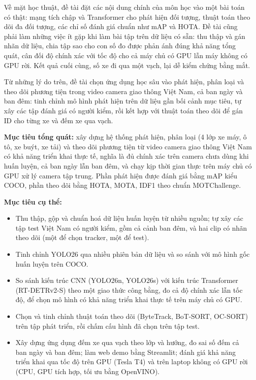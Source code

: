 Về mặt học thuật, đề tài đặt các nội dung chính của môn học vào một bài toán có thật: mạng tích chập và Transformer cho
phát hiện đối tượng, thuật toán theo dõi đa đối tượng, các chỉ số đánh giá chuẩn như mAP và HOTA. Đề tài cũng phải làm
những việc ít gặp khi làm bài tập trên dữ liệu có sẵn: thu thập và gán nhãn dữ liệu, chia tập sao cho con số đo được
phản ánh đúng khả năng tổng quát, cân đối độ chính xác với tốc độ cho cả máy chủ có GPU lẫn máy không có GPU rời. Kết
quả cuối cùng, số xe đi qua một vạch, lại dễ kiểm chứng bằng mắt.

Từ những lý do trên, đề tài chọn ứng dụng học sâu vào phát hiện, phân loại và theo dõi phương tiện trong video camera
giao thông Việt Nam, cả ban ngày và ban đêm: tinh chỉnh mô hình phát hiện trên dữ liệu gần bối cảnh mục tiêu, tự xây
các tập đánh giá có người kiểm, rồi kết hợp với thuật toán theo dõi để gán ID cho từng xe và đếm xe qua vạch.


\textbf{Mục tiêu tổng quát:} xây dựng hệ thống phát hiện, phân loại (4 lớp xe máy, ô tô, xe buýt, xe tải) và theo dõi
phương tiện từ video camera giao thông Việt Nam có khả năng triển khai thực tế, nghĩa là đủ chính xác trên camera chưa
dùng khi huấn luyện, cả ban ngày lẫn ban đêm, và chạy kịp thời gian thực trên máy chủ có GPU xử lý camera tập trung.
Phần phát hiện được đánh giá bằng mAP kiểu COCO, phần theo dõi bằng HOTA, MOTA, IDF1 theo chuẩn MOTChallenge.

\textbf{Mục tiêu cụ thể:}
\begin{itemize}
  \item Thu thập, gộp và chuẩn hoá dữ liệu huấn luyện từ nhiều nguồn; tự xây các tập test Việt Nam có người kiểm, gồm
        cả cảnh ban đêm, và hai clip có nhãn theo dõi (một để chọn tracker, một để test).
  \item Tinh chỉnh YOLO26 qua nhiều phiên bản dữ liệu và so sánh với mô hình gốc huấn luyện trên COCO.
  \item So sánh kiến trúc CNN (YOLO26n, YOLO26s) với kiến trúc Transformer (RT-DETRv2-S) theo một giao thức công bằng,
        đo cả độ chính xác lẫn tốc độ, để chọn mô hình có khả năng triển khai thực tế trên máy chủ có GPU.
  \item Chọn và tinh chỉnh thuật toán theo dõi (ByteTrack, BoT-SORT, OC-SORT) trên tập phát triển, rồi chấm cấu hình đã
        chọn trên tập test.
  \item Xây dựng ứng dụng đếm xe qua vạch theo lớp và hướng, đo sai số đếm cả ban ngày và ban đêm; làm web demo bằng
        Streamlit; đánh giá khả năng triển khai qua tốc độ trên GPU (Tesla T4) và trên laptop không có GPU rời (CPU, GPU
        tích hợp, tối ưu bằng OpenVINO).
\end{itemize}

